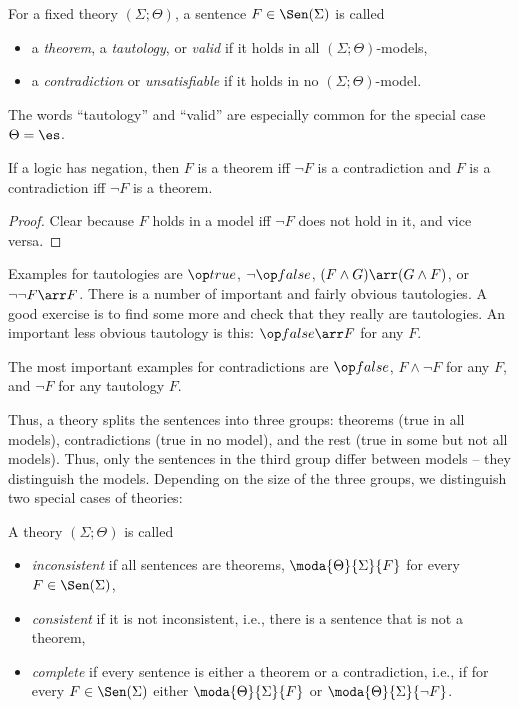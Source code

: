 \begin{definition}\label{def:mod:theorem}
For a fixed theory $(\Sigma;\Theta)$, a sentence $F\in\Sen(\Sigma)$ is called
\begin{itemize}
\item a \emph{theorem}, a \emph{tautology}, or \emph{valid} if it holds in all $(\Sigma;\Theta)$-models,
\item a \emph{contradiction} or \emph{unsatisfiable} if it holds in no $(\Sigma;\Theta)$-model.
\end{itemize}
The words ``tautology'' and ``valid'' are especially common for the special case $\Theta=\es$.
\end{definition}

\begin{lemma}
If a logic has negation, then $F$ is a theorem iff $\neg F$ is a contradiction and $F$ is a contradiction iff $\neg F$ is a theorem.
\end{lemma}
\begin{proof}
Clear because $F$ holds in a model iff $\neg F$ does not hold in it, and vice versa.
\end{proof}

\begin{example}
Examples for tautologies are $\true$, $\neg\false$, $(F\wedge G)\arr (G\wedge F)$, or $\neg\neg F\arr F$. There is a number of important and fairly obvious tautologies. A good exercise is to find some more and check that they really are tautologies. An important less obvious tautology is this: $\false\arr F$ for any $F$.

The most important examples for contradictions are $\false$, $F\wedge\neg F$ for any $F$, and $\neg F$ for any tautology $F$.
\end{example}

Thus, a theory splits the sentences into three groups: theorems (true in all models), contradictions (true in no model), and the rest (true in some but not all models). Thus, only the sentences in the third group differ between models -- they distinguish the models. Depending on the size of the three groups, we distinguish two special cases of theories:

\begin{definition}\label{def:mod:consistent}
A theory $(\Sigma;\Theta)$ is called
\begin{itemize}
 \item \emph{inconsistent} if all sentences are theorems, $\moda{\Theta}{\Sigma}{F}$ for every $F\in\Sen(\Sigma)$,
 \item \emph{consistent} if it is not inconsistent, i.e., there is a sentence that is not a theorem,
 \item \emph{complete} if every sentence is either a theorem or a contradiction, i.e., if for every $F\in\Sen(\Sigma)$ either $\moda{\Theta}{\Sigma}{F}$ or $\moda{\Theta}{\Sigma}{\neg F}$.
\end{itemize}
\end{definition}

